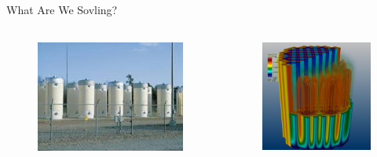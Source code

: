 \documentclass[xcolor=x11names,compress]{beamer}
\renewcommand{\(}{\begin{columns}}
\renewcommand{\)}{\end{columns}}
\newcommand{\<}[1]{\begin{column}{#1}}
\renewcommand{\>}{\end{column}}
\begin{document}
\begin{frame}{What Are We Sovling?}
    \begin{columns}
    \begin{column}{0.55\textwidth}     
 	   \begin{center}
 	   \begin{figure}
 	   \includegraphics[height=1.5in,clip]{../figs/isfsi}
       \end{figure}
 	   \end{center}
  	\end{column}
 	\begin{column}{0.4\textwidth}
 	   \begin{center}
 	   \begin{figure}     
 	   \includegraphics[height=1.5in,clip]{../figs/denovo-pwr}
 	   \end{figure}
 	   \end{center}
  	\end{column}
    \end{columns}
   
\end{frame}
\end{document}
